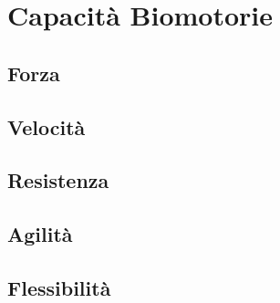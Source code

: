 \documentclass[../uefaC.tex]{subfiles}
\begin{document}
\section{Capacità Biomotorie}

\subsection{Forza}

\subsection{Velocità}

\subsection{Resistenza}

\subsection{Agilità}

\subsection{Flessibilità}
\end{document}
